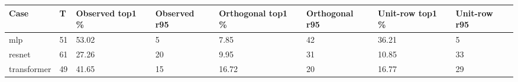 \begin{tabular}{@{}llllllll@{}}
\toprule
Case & T & Observed top1 \% & Observed r95 & Orthogonal top1 \% & Orthogonal r95 & Unit-row top1 \% & Unit-row r95 \\
\midrule
mlp & 51 & 53.02 & 5 & 7.85 & 42 & 36.21 & 5 \\
resnet & 61 & 27.26 & 20 & 9.95 & 31 & 10.85 & 33 \\
transformer & 49 & 41.65 & 15 & 16.72 & 20 & 16.77 & 29 \\
\bottomrule
\end{tabular}
